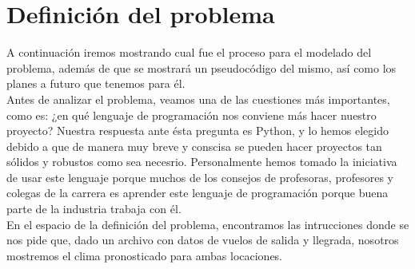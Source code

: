 \documentclass[letterpaper]{article}
\begin{document}
\section{Definición del problema}
A continuación iremos mostrando cual fue el proceso para el modelado del problema, además de que se mostrará un pseudocódigo del mismo, así como los planes a futuro que tenemos para él.\\
Antes de analizar el problema, veamos una de las cuestiones más importantes, como es: ¿en qué lenguaje de programación nos conviene más hacer nuestro proyecto? Nuestra respuesta ante ésta pregunta es Python, y lo hemos elegido debido a que de manera muy breve y conscisa se pueden hacer proyectos tan sólidos y robustos como sea necesrio. Personalmente hemos tomado la iniciativa de usar este lenguaje porque muchos de los consejos de profesoras, profesores y colegas de la carrera es aprender este lenguaje de programación porque buena parte de la industria trabaja con él.\\

En el espacio de la definición del problema, encontramos las intrucciones donde se nos pide que, dado un archivo con datos de vuelos de salida y llegrada, nosotros mostremos el clima pronosticado para ambas locaciones.
\end{document}

